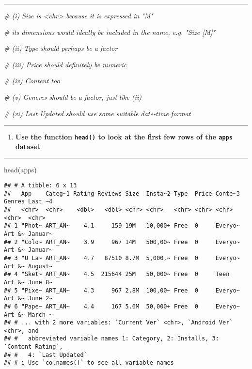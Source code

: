 \documentclass[
]{article}
\newenvironment{Shaded}{\begin{snugshade}}{\end{snugshade}}
\newcommand{\CommentTok}[1]{\textcolor[rgb]{0.56,0.35,0.01}{\textit{#1}}}
\newcommand{\FunctionTok}[1]{\textcolor[rgb]{0.00,0.00,0.00}{#1}}
\newcommand{\NormalTok}[1]{#1}
\providecommand{\tightlist}{%
  \setlength{\itemsep}{0pt}\setlength{\parskip}{0pt}}
\begin{document}
\begin{center}\rule{0.5\linewidth}{0.5pt}\end{center}

\begin{Shaded}
\begin{Highlighting}[]
\CommentTok{\# (i) Size is \textless{}chr\textgreater{} because it is expressed in "M"}

\CommentTok{\# its dimensions would ideally be included in the name, e.g. "Size [M]"}

\CommentTok{\# (ii) Type should perhaps be a factor}

\CommentTok{\# (iii) Price should definitely be numeric}

\CommentTok{\# (iv) Content too}

\CommentTok{\# (v) Generes should be a factor, just like (ii)}

\CommentTok{\# (vi) Last Updated should use some suitable date{-}time format}
\end{Highlighting}
\end{Shaded}

\begin{center}\rule{0.5\linewidth}{0.5pt}\end{center}

\begin{enumerate}
\def\labelenumi{\arabic{enumi}.}
\setcounter{enumi}{7}
\tightlist
\item
  \textbf{Use the function \texttt{head()} to look at the first few rows
  of the \texttt{apps} dataset}
\end{enumerate}

\begin{center}\rule{0.5\linewidth}{0.5pt}\end{center}

\begin{Shaded}
\begin{Highlighting}[]
\FunctionTok{head}\NormalTok{(apps)}
\end{Highlighting}
\end{Shaded}

\begin{verbatim}
## # A tibble: 6 x 13
##   App    Categ~1 Rating Reviews Size  Insta~2 Type  Price Conte~3 Genres Last ~4
##   <chr>  <chr>    <dbl>   <dbl> <chr> <chr>   <chr> <chr> <chr>   <chr>  <chr>  
## 1 "Phot~ ART_AN~    4.1     159 19M   10,000+ Free  0     Everyo~ Art &~ Januar~
## 2 "Colo~ ART_AN~    3.9     967 14M   500,00~ Free  0     Everyo~ Art &~ Januar~
## 3 "U La~ ART_AN~    4.7   87510 8.7M  5,000,~ Free  0     Everyo~ Art &~ August~
## 4 "Sket~ ART_AN~    4.5  215644 25M   50,000~ Free  0     Teen    Art &~ June 8~
## 5 "Pixe~ ART_AN~    4.3     967 2.8M  100,00~ Free  0     Everyo~ Art &~ June 2~
## 6 "Pape~ ART_AN~    4.4     167 5.6M  50,000+ Free  0     Everyo~ Art &~ March ~
## # ... with 2 more variables: `Current Ver` <chr>, `Android Ver` <chr>, and
## #   abbreviated variable names 1: Category, 2: Installs, 3: `Content Rating`,
## #   4: `Last Updated`
## # i Use `colnames()` to see all variable names
\end{verbatim}
\end{document}
